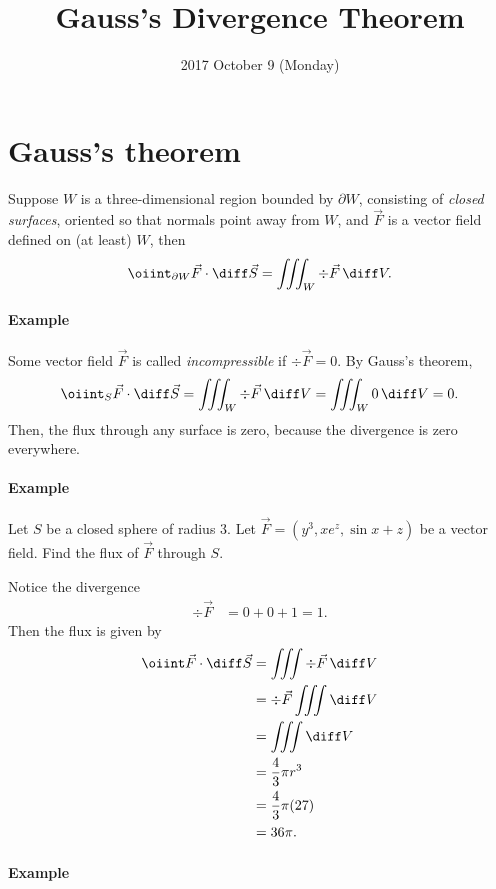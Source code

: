 \documentclass{multi}
\title{Gauss's Divergence Theorem}
\date{2017 October 9 (Monday)}
\begin{document}
\section*{Gauss's theorem}

Suppose \(W\) is a three-dimensional region bounded by \(\partial W\),
consisting of \emph{closed surfaces}, oriented so that normals point away from
\(W\), and \(\vec F\) is a vector field defined on (at least) \(W\), then
\[
\oiint_{\partial W} \vec F \cdot \diff \vec S = \iiint_W \div \vec F \, \diff
V.
\]

\paragraph{Example}

Some vector field \(\vec F\) is called \emph{incompressible} if \(\div \vec F =
0\). By Gauss's theorem,
\[
\oiint_S \vec F \cdot \diff \vec S = \iiint_W \div \vec F \, \diff V = \iiint_W 0
\, \diff V = 0.
\]
Then, the flux through any surface is zero, because the divergence is zero everywhere.

\paragraph{Example}

Let \(S\) be a closed sphere of radius \(3\).  Let \(\vec F = (y^3, x e^z, \sin
x + z)\) be a vector field. Find the flux of \(\vec F\) through \(S\).

Notice the divergence
\begin{align*}
  \div \vec F &= 0 + 0 + 1 = 1.
\end{align*}
Then the flux is given by
\begin{align*}
  \oiint \vec F \cdot \diff \vec S &= \iiint \div \vec F \, \diff V \\
  &= \div \vec F \iiint \diff V \\
  &= \iiint \diff V \\
  &= \frac 4 3 \pi r^3 \\
  &= \frac 4 3 \pi (27) \\
  &= 36 \pi.
\end{align*}

\paragraph{Example}
\end{document}
